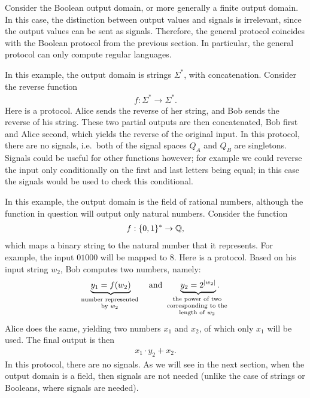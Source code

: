\begin{myexample}
    Consider the Boolean output domain, or more generally a finite output domain. In this case, the distinction between output values and signals is irrelevant, since the output values can be sent as signals. Therefore, the general protocol coincides with the Boolean protocol from the previous section. In particular, the general protocol can only compute regular languages. 
\end{myexample}

\begin{myexample}
    In this example, the output domain is strings $\Sigma^*$, with concatenation. 
    Consider the  reverse function 
    \begin{align*}
    f : \Sigma^* \to \Sigma^*.
    \end{align*}
    Here is a  protocol. Alice sends the reverse of her string, and Bob sends the reverse of his string. These two partial outputs are then concatenated, Bob first and Alice second, which yields the reverse of the original input. In this protocol, there are no signals, i.e.~both of the signal spaces $Q_A$ and $Q_B$ are singletons. Signals could be useful for other functions however; for example we could reverse the input only conditionally on the first and last letters being equal; in this case the signals would be used to check this conditional.
\end{myexample}

\begin{myexample}
    In this example, the output domain is the field of rational numbers, although the function in question will output only natural numbers.
    Consider the function 
    \begin{align*}
    f : \{0,1\}^* \to \mathbb Q,
    \end{align*}
    which maps a binary string to the natural number that it represents. For example, the input $01000$ will be mapped to $8$. Here is a protocol. Based on his input string $w_2$, Bob computes two numbers, namely: 
    \begin{align*}
    \myunderbrace{y_1 = f(w_2)}{number represented\\  by $w_2$} 
    \qquad \text{and} \qquad 
    \myunderbrace{y_2 = 2^{|w_2|}}{the power of two \\ corresponding to the\\ length of $w_2$}.
    \end{align*}
    Alice does the same, yielding two numbers $x_1$ and $x_2$, of which only $x_1$ will be used. The final output is then 
    \begin{align*}
    x_1\cdot y_2 + x_2.
    \end{align*}
    In this protocol, there are no signals. As we will see in the next section, when the output domain is a field, then signals are not needed (unlike the case of strings or Booleans, where signals are needed).
\end{myexample}



